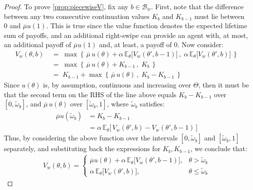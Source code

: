 \begin{proof}
    To prove \autoref{prop:piecewiseV}, fix any $b\in\mathcal{B}_w$. First, note that the difference between any two consecutive continuation values $K_b$ and $K_{b-1}$ must lie between 0 and $\overline{\mu}u(1)$. This is true since the value function denotes the expected lifetime sum of payoffs, and an additional right-swipe can provide an agent with, at most, an additional payoff of $\overline{\mu}u(1)$ and, at least, a payoff of $0$. Now consider:
    \begin{equation*}
        \begin{aligned} 
            V_w(\theta,b) \;&=\;\max\left\{\,\overline{\mu} \, u(\theta) +\alpha \,\mathbb{E}_\theta \Big[V_w(\theta', b-1)\Big]\,,\; \alpha\,\mathbb{E}_\theta \Big[ V_w(\theta', b)\Big]\,\right\}\\
            &=\; \max\left\{\,\overline{\mu} \, u(\theta) + K_{b-1} \,,\; K_b \,\right\}\\
            &=\; K_{b-1} + \max\left\{\,\overline{\mu} \, u(\theta) \,,\; K_b - K_{b-1}\,\right\}
        \end{aligned}
    \end{equation*}
    Since $u(\theta)$ is, by assumption, continuous and increasing over $\Theta$, then it must be that the second term on the RHS of the line above equals $K_b - K_{b-1}$ over $[0, \widetilde\omega_b]$, and $\overline{\mu} \, u(\theta)$ over $[\widetilde\omega_b, 1]$, where $\widetilde\omega_b$ satisfies: 
    \begin{equation*}
        \begin{aligned} 
            \overline\mu u(\widetilde\omega_b) &= K_b-K_{b-1} \\
            &=\alpha \, \mathbb{E}_\theta\Big[\,V_w(\theta',b)-V_w(\theta',b-1)\,\Big]
        \end{aligned} 
    \end{equation*}
    Thus, by considering the above function over the intervals $[0, \widetilde\omega_b]$ and $[\widetilde\omega_b, 1]$ separately, and substituting back the expressions for $K_b, K_{b-1}$, we conclude that:
    \begin{equation*}
    \begin{split}
        V_w(\theta,b)=\begin{cases}
            \overline\mu u(\theta) +\alpha \,\mathbb{E}_{\theta}\Big[V_w(\theta', b-1)\Big],& \theta> \widetilde \omega_b \\[10pt]
            \alpha \,\mathbb{E}_{\theta}\Big[V_w(\theta', b)\Big],& \theta\leq\widetilde \omega_b
        \end{cases} 
    \end{split}
    \end{equation*} 


\end{proof}
